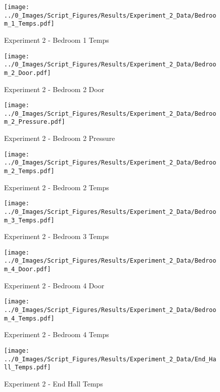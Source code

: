 	\begin{figure}[H]
		\centering
		\texttt{[image: ../0\_Images/Script\_Figures/Results/Experiment\_2\_Data/Bedroom\_1\_Temps.pdf]}
		\caption[]{Experiment 2 - Bedroom 1 Temps}
	\end{figure}
 
	\clearpage

	\begin{figure}[H]
		\centering
		\texttt{[image: ../0\_Images/Script\_Figures/Results/Experiment\_2\_Data/Bedroom\_2\_Door.pdf]}
		\caption[]{Experiment 2 - Bedroom 2 Door}
	\end{figure}
 

	\begin{figure}[H]
		\centering
		\texttt{[image: ../0\_Images/Script\_Figures/Results/Experiment\_2\_Data/Bedroom\_2\_Pressure.pdf]}
		\caption[]{Experiment 2 - Bedroom 2 Pressure}
	\end{figure}
 
	\clearpage

	\begin{figure}[H]
		\centering
		\texttt{[image: ../0\_Images/Script\_Figures/Results/Experiment\_2\_Data/Bedroom\_2\_Temps.pdf]}
		\caption[]{Experiment 2 - Bedroom 2 Temps}
	\end{figure}
 

	\begin{figure}[H]
		\centering
		\texttt{[image: ../0\_Images/Script\_Figures/Results/Experiment\_2\_Data/Bedroom\_3\_Temps.pdf]}
		\caption[]{Experiment 2 - Bedroom 3 Temps}
	\end{figure}
 
	\clearpage

	\begin{figure}[H]
		\centering
		\texttt{[image: ../0\_Images/Script\_Figures/Results/Experiment\_2\_Data/Bedroom\_4\_Door.pdf]}
		\caption[]{Experiment 2 - Bedroom 4 Door}
	\end{figure}
 

	\begin{figure}[H]
		\centering
		\texttt{[image: ../0\_Images/Script\_Figures/Results/Experiment\_2\_Data/Bedroom\_4\_Temps.pdf]}
		\caption[]{Experiment 2 - Bedroom 4 Temps}
	\end{figure}
 
	\clearpage

	\begin{figure}[H]
		\centering
		\texttt{[image: ../0\_Images/Script\_Figures/Results/Experiment\_2\_Data/End\_Hall\_Temps.pdf]}
		\caption[]{Experiment 2 - End Hall Temps}
	\end{figure}
 

